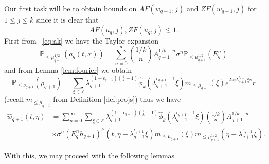 \documentclass[12pt,reqno,letterpaper]{amsart}
\numberwithin{equation}{section}
\newcommand{\1}{{\bf 1}}
\newcommand{\2}{{\bf 2}}
\newcommand{\Z}{\mathbb Z}
\theoremstyle{remark}
\theoremstyle{remark}
\begin{document}
Our first task will be to obtain bounds on $AF(w_{q+1},j)$ and $ZF(w_{q+1},j)$ for $1 \leq j \leq k$ since it is clear that
$$
AF(u_q,j), ZF(u_q,j) \lesssim 1.
$$
First from ~\eqref{eq:ak} we have the Taylor expansion
\begin{equation*}
    \mathbb{P}_{\leq \mu_{q+1}^{1/2}}\left( a_q(t,x) \right) = \sum_{n=0}^\infty \binom{1/k}{n} A_{q+1}^{1/k - n} \sigma^n \mathbb{P}_{\leq \mu_{q+1}^{1/2}} \left(E_q^n\right)
\end{equation*}
and from Lemma \ref{lem:fourier} we obtain
\begin{equation*}
    \mathbb{P}_{\leq \nu_{q+1}}\left(\rho_{q+1}\right) = \sum_{\xi \in \Z} \lambda_{q+1}^{(1-\epsilon_{q+1})\left(\frac{1}{k}-1\right)} \hat{\phi}_k\left(\lambda_{q+1}^{\epsilon_{q+1}-1}\xi\right) m_{\leq \mu_{q+1}}(\xi) e^{2\pi i \lambda_{q+1}^{\epsilon_{q+1}} \xi x}r
\end{equation*}
(recall $m_{\leq \mu_{q+1}}$ from Definition \ref{def:projs}) thus we have
\begin{equation*}
\begin{split}
    \hat{w}_{q+1}(t,\eta) &= \sum_{n=0}^\infty \sum_{\xi \in \Z} \lambda_{q+1}^{(1-\epsilon_{q+1})\left(\frac{1}{k}-1\right)} \hat{\phi}_k\left(\lambda_{q+1}^{\epsilon_{q+1}-1}\xi\right) \binom{1/k}{n} A_{q+1}^{1/k-n} \\
    &\times \sigma^n  \left(E_q^n h_{q+1}\right)^\wedge(t,\eta - \lambda_{q+1}^{\epsilon_{q+1}} \xi) m_{\leq \mu_{q+1}}(\xi)m_{\leq \mu_{q+1}^{1/2}}(\eta-\lambda_{q+1}^{\epsilon_{q+1}}\xi).
    \end{split}
\end{equation*}

With this, we may proceed with the following lemmas
\end{document}
